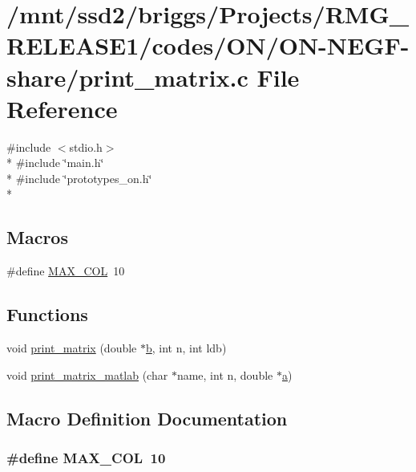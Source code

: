 \hypertarget{_o_n_2_o_n-_n_e_g_f-share_2print__matrix_8c}{\section{/mnt/ssd2/briggs/\-Projects/\-R\-M\-G\-\_\-\-R\-E\-L\-E\-A\-S\-E1/codes/\-O\-N/\-O\-N-\/\-N\-E\-G\-F-\/share/print\-\_\-matrix.c File Reference}
\label{_o_n_2_o_n-_n_e_g_f-share_2print__matrix_8c}
}
{\ttfamily \#include $<$stdio.\-h$>$}\\*
{\ttfamily \#include \char`\"{}main.\-h\char`\"{}}\\*
{\ttfamily \#include \char`\"{}prototypes\-\_\-on.\-h\char`\"{}}\\*
\subsection*{Macros}
\begin{DoxyCompactItemize}
\item 
\#define \hyperlink{_o_n_2_o_n-_n_e_g_f-share_2print__matrix_8c_a97e80440b5a5ec2ffc172dead9f8d2ec}{M\-A\-X\-\_\-\-C\-O\-L}~10
\end{DoxyCompactItemize}
\subsection*{Functions}
\begin{DoxyCompactItemize}
\item 
void \hyperlink{_o_n_2_o_n-_n_e_g_f-share_2print__matrix_8c_aa262f6850c59bfe3c837f4457dcbc36d}{print\-\_\-matrix} (double $\ast$\hyperlink{gga__xc__th_8c_a5dd9476685b5767af6e72579b9d3b42e}{b}, int n, int ldb)
\item 
void \hyperlink{_o_n_2_o_n-_n_e_g_f-share_2print__matrix_8c_ab9b117a0017293862b5bced5301729f6}{print\-\_\-matrix\-\_\-matlab} (char $\ast$name, int n, double $\ast$\hyperlink{gga__xc__th_8c_abf59cc952e724dd76e644ff9480786d9}{a})
\end{DoxyCompactItemize}


\subsection{Macro Definition Documentation}
\hypertarget{_o_n_2_o_n-_n_e_g_f-share_2print__matrix_8c_a97e80440b5a5ec2ffc172dead9f8d2ec}{
\subsubsection[{M\-A\-X\-\_\-\-C\-O\-L}]{\setlength{\rightskip}{0pt plus 5cm}\#define M\-A\-X\-\_\-\-C\-O\-L~10}}\label{_o_n_2_o_n-_n_e_g_f-share_2print__matrix_8c_a97e80440b5a5ec2ffc172dead9f8d2ec}


